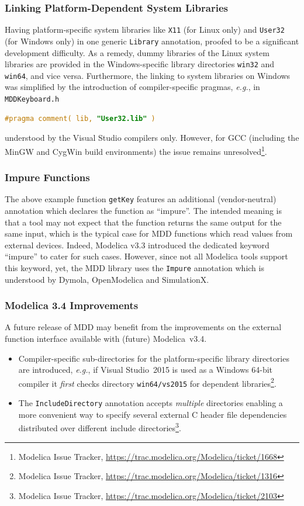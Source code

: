 \documentclass{resources/modelica}
\newcommand{\modelica}[1]{\lstinline[language=modelica]|#1|}
\begin{document}
\subsubsection{Linking Platform-Dependent System Libraries}

Having platform-specific system libraries like \modelica{X11} (for Linux only) and \modelica{User32} (for Windows only) in one generic \modelica{Library} annotation, proofed to be a significant development difficulty. As a remedy, dummy libraries of the Linux system libraries are provided in the Windows-specific library directories \modelica{win32} and \modelica{win64}, and vice versa. Furthermore, the linking to system libraries on Windows was simplified by the introduction of compiler-specific pragmas, \textit{e.g.}, in \modelica{MDDKeyboard.h}
\begin{lstlisting}[language=C]
#pragma comment( lib, "User32.lib" )
\end{lstlisting}
understood by the Visual Studio compilers only. However, for GCC (including the MinGW and CygWin build environments) the issue remains unresolved\footnote{Modelica Issue Tracker, \url{https://trac.modelica.org/Modelica/ticket/1668}}.

\subsubsection{Impure Functions}

The above example function \modelica{getKey} features an additional (vendor-neutral) annotation which declares the function
as ``impure''. The intended meaning is that a tool may not expect that the
function returns the same output for the same input, which is the typical case
for MDD functions which read values from external devices. Indeed, Modelica v3.3 introduced the dedicated keyword
``impure'' to cater for such cases. However, since not all Modelica tools support this
keyword, yet, the MDD library uses the \modelica{Impure} annotation which is understood
by Dymola, OpenModelica and SimulationX.

\subsubsection{Modelica 3.4 Improvements}

A future release of MDD may benefit from the improvements on the external function interface available with (future) Modelica~v3.4.
\begin{itemize}
 \item Compiler-specific sub-directories for the platform-specific library directories are introduced, \textit{e.g.}, if Visual Studio~2015 is used as a Windows 64-bit compiler it \emph{first} checks directory \modelica{win64/vs2015} for dependent libraries\footnote{Modelica Issue Tracker, \url{https://trac.modelica.org/Modelica/ticket/1316}}.
 \item The \modelica{IncludeDirectory} annotation accepts \emph{multiple} directories enabling a more convenient way to specify several external C header file dependencies distributed over different include directories\footnote{Modelica Issue Tracker, \url{https://trac.modelica.org/Modelica/ticket/2103}}.
\end{itemize}
\end{document}

